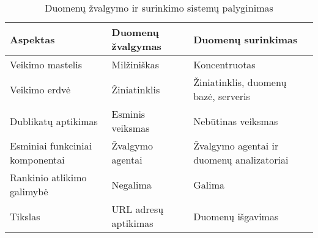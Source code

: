 \begin{table}[htbp]
  \centering
  \caption{Duomenų žvalgymo ir surinkimo sistemų palyginimas \cite{PromptCloudScrapingVsCrawling}}
    \begin{tabular}{|l|l|p{13.57em}|}
    \hline
    \textbf{Aspektas} & \textbf{Duomenų žvalgymas} & \textbf{Duomenų surinkimas} \bigstrut\\
    \hline
    Veikimo mastelis & Milžiniškas & Koncentruotas \bigstrut\\
    \hline
    Veikimo erdvė & Žiniatinklis & Žiniatinklis, duomenų bazė, serveris \bigstrut\\
    \hline
    Dublikatų aptikimas & Esminis veiksmas & Nebūtinas veiksmas \bigstrut\\
    \hline
    \multicolumn{1}{|p{12.285em}|}{Esminiai funkciniai komponentai} & Žvalgymo agentai & Žvalgymo agentai ir duomenų analizatoriai \bigstrut\\
    \hline
    Rankinio atlikimo galimybė & Negalima & Galima \bigstrut\\
    \hline
    Tikslas & URL adresų aptikimas & Duomenų išgavimas \bigstrut\\
    \hline
    \end{tabular}%
  \label{tab:crawling_vs_scraping}%
\end{table}%